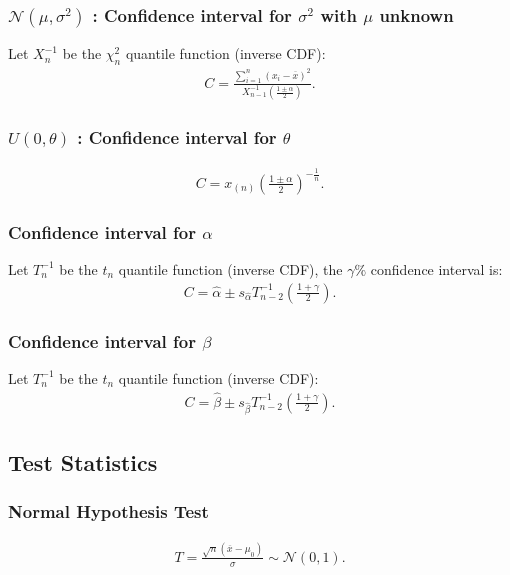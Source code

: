 \documentclass[a4paper, 12pt, twoside]{article}
\begin{document}
\subsubsection{$\mathcal{N}(\mu, \sigma^2)$ : Confidence
    interval for $\sigma^2$ with $\mu$ unknown}
Let $X_n^{-1}$ be the $\chi^2_n$ quantile function (inverse CDF):
\begin{align*}
    C = \frac{\sum_{i = 1}^n(x_i - \overline{x})^2}
    {X_{n-1}^{-1}\left(\frac{1 \pm \alpha}{2}\right)}.
\end{align*}

\subsubsection{$U(0, \theta)$ : Confidence interval for $\theta$}
\begin{align*}
    C = x_{(n)}\left(\frac{1 \pm \alpha}{2}\right)^{-\frac{1}{n}}.
\end{align*}

\subsubsection{Confidence interval for $\alpha$}
Let $T^{-1}_n$ be the $t_n$ quantile function (inverse CDF),
the $\gamma\%$ confidence interval is:
\begin{align*}
    C = \hat\alpha \pm s_{\hat\alpha}
    T^{-1}_{n - 2}\left(\frac{1 + \gamma}{2}\right).
\end{align*}

\subsubsection{Confidence interval for $\beta$}
Let $T^{-1}_n$ be the $t_n$ quantile function (inverse CDF):
\begin{align*}
    C = \hat\beta \pm s_{\hat\beta}
    T^{-1}_{n - 2}\left(\frac{1 + \gamma}{2}\right).
\end{align*}

\subsection{Test Statistics}

\subsubsection{Normal Hypothesis Test}
\begin{gather*}
    T = \frac{\sqrt{n}(\overline{x} - \mu_0)}{\sigma}
    \sim \mathcal{N}(0, 1).
\end{gather*}
\end{document}
